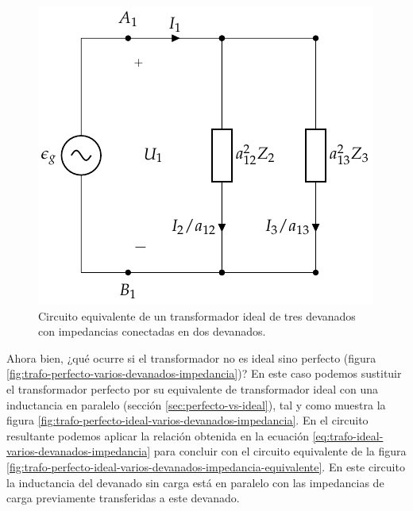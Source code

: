 \begin{figure}
  \centering
  \includegraphics[height=.25\textheight]{../figs/TrafoIdealVariosDevanados_Impedancia_Equivalente.pdf}
  \caption{Circuito equivalente de un transformador ideal de tres devanados con impedancias conectadas en dos devanados.}
  \label{fig:trafo-ideal-varios-devanados-impedancia-equivalente}
\end{figure}
Ahora bien, ¿qué ocurre si el transformador no es ideal sino perfecto (figura \ref{fig:trafo-perfecto-varios-devanados-impedancia})? En este caso podemos sustituir el transformador perfecto por su equivalente de transformador ideal con una inductancia en paralelo (sección \ref{sec:perfecto-vs-ideal}), tal y como muestra la figura \ref{fig:trafo-perfecto-ideal-varios-devanados-impedancia}. En el circuito resultante podemos aplicar la relación obtenida en la ecuación \ref{eq:trafo-ideal-varios-devanados-impedancia} para concluir con el circuito equivalente de la figura \ref{fig:trafo-perfecto-ideal-varios-devanados-impedancia-equivalente}. En este circuito la inductancia del devanado sin carga está en paralelo con las impedancias de carga previamente transferidas a este devanado.

